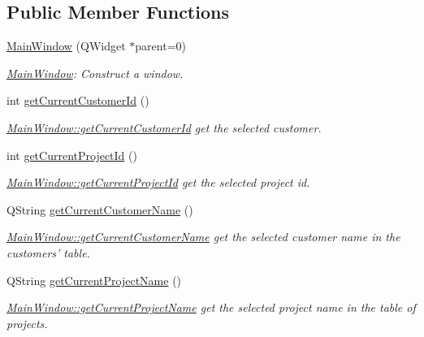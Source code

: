 \subsection*{Public Member Functions}
\begin{DoxyCompactItemize}
\item 
\hyperlink{classMainWindow_a8b244be8b7b7db1b08de2a2acb9409db}{Main\+Window} (Q\+Widget $\ast$parent=0)
\begin{DoxyCompactList}\small\item\em \hyperlink{classMainWindow}{Main\+Window}\+: Construct a window. \end{DoxyCompactList}\item 
int \hyperlink{classMainWindow_a0584b17eb78c07b513524a09bd914042}{get\+Current\+Customer\+Id} ()
\begin{DoxyCompactList}\small\item\em \hyperlink{classMainWindow_a0584b17eb78c07b513524a09bd914042}{Main\+Window\+::get\+Current\+Customer\+Id} get the selected customer. \end{DoxyCompactList}\item 
int \hyperlink{classMainWindow_a08d33fd0a3a0a46e39393fefcfc97a05}{get\+Current\+Project\+Id} ()
\begin{DoxyCompactList}\small\item\em \hyperlink{classMainWindow_a08d33fd0a3a0a46e39393fefcfc97a05}{Main\+Window\+::get\+Current\+Project\+Id} get the selected project id. \end{DoxyCompactList}\item 
Q\+String \hyperlink{classMainWindow_a11baa86aa3af94b94d9566523f1b95cb}{get\+Current\+Customer\+Name} ()
\begin{DoxyCompactList}\small\item\em \hyperlink{classMainWindow_a11baa86aa3af94b94d9566523f1b95cb}{Main\+Window\+::get\+Current\+Customer\+Name} get the selected customer name in the customers' table. \end{DoxyCompactList}\item 
Q\+String \hyperlink{classMainWindow_a22db779c9d551c0c3adeb78a984ced8a}{get\+Current\+Project\+Name} ()
\begin{DoxyCompactList}\small\item\em \hyperlink{classMainWindow_a22db779c9d551c0c3adeb78a984ced8a}{Main\+Window\+::get\+Current\+Project\+Name} get the selected project name in the table of projects. \end{DoxyCompactList}\item 

\end{DoxyCompactItemize}
